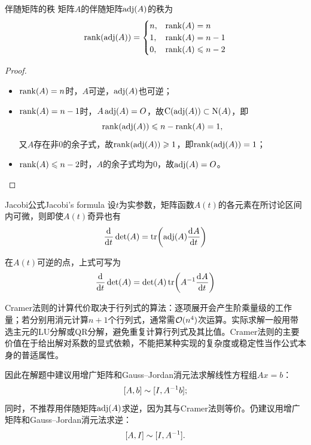\begin{theorem}
	{伴随矩阵的秩}{}
	矩阵$A$的伴随矩阵$\operatorname{adj}(A)$的秩为
	\begin{equation}
		\operatorname{rank}(\operatorname{adj}(A)) = \begin{cases}
			n,&\operatorname{rank}(A) = n\\
			1,&\operatorname{rank}(A) = n - 1\\
			0,&\operatorname{rank}(A) \leqslant n - 2\\
		\end{cases}
	\end{equation}
\end{theorem}

\begin{proof}
	~
	\begin{itemize}
		\item $\operatorname{rank}(A) = n$时，$A$可逆，$\operatorname{adj}(A)$也可逆；
		
		\item $\operatorname{rank}(A) = n - 1$时，$A\operatorname{adj}(A) = O$，故$\operatorname{C}(\operatorname{adj}(A)) \subset \operatorname{N}(A)$，即
		\[
			\operatorname{rank}(\operatorname{adj}(A)) \leqslant n - \operatorname{rank}(A) = 1,
		\]
		又$A$存在非0的余子式，故$\operatorname{rank}(\operatorname{adj}(A)) \geqslant 1$，即$\operatorname{rank}(\operatorname{adj}(A)) = 1$；
	
		\item $\operatorname{rank}(A) \leqslant n - 2$时，$A$的余子式均为0，故$\operatorname{adj}(A) = O$。
		\qedhere
	\end{itemize}
\end{proof}

\begin{theorem}
	{Jacobi公式}{Jacobi's formula}
	设$t$为实参数，矩阵函数$A(t)$的各元素在所讨论区间内可微，则即使$A(t)$奇异也有
	\begin{equation}
		\label{eqn:Jacobi det'}
		\frac{\mathop{}\!\mathrm{d}^{}}{\mathrm{d}{t}^{}}\det(A) = \operatorname{tr}\biggl(\operatorname{adj}(A)\frac{\mathop{}\!\mathrm{d}^{}A}{\mathrm{d}{t}^{}}\biggr)
	\end{equation}
\end{theorem}

\begin{corollary}
	在$A(t)$可逆的点，上式可写为
	\begin{equation}
		\frac{\mathop{}\!\mathrm{d}^{}}{\mathrm{d}{t}^{}}\det(A) = \det(A)\operatorname{tr}\biggl(A^{-1}\frac{\mathop{}\!\mathrm{d}^{}A}{\mathrm{d}{t}^{}}\biggr)
	\end{equation}
\end{corollary}

\begin{remark}
	Cramer法则的计算代价取决于行列式的算法：逐项展开会产生阶乘量级的工作量；若分别用消元计算$n + 1$个行列式，通常需$\mathcal{O}(n^4)$次运算。实际求解一般用带选主元的LU分解或QR分解，避免重复计算行列式及其比值。Cramer法则的主要价值在于给出解对系数的显式依赖，不能把某种实现的复杂度或稳定性当作公式本身的普适属性。

	因此在解题中建议用增广矩阵和Gauss--Jordan消元法求解线性方程组$Ax = b$：
	\[
		[A,b] \sim [I,A^{-1} b];
	\]
	同时，不推荐用伴随矩阵$\operatorname{adj}(A)$求逆，因为其与Cramer法则等价。仍建议用增广矩阵和Gauss--Jordan消元法求逆：
	\[
		[A,I] \sim [I,A^{-1}].
	\]
\end{remark}
